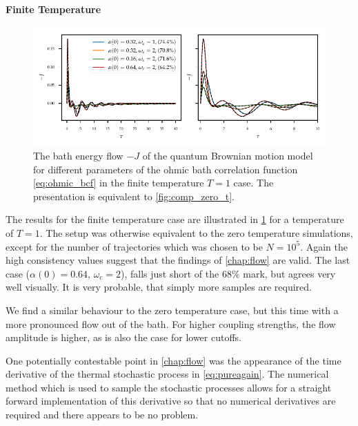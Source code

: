 
\paragraph{Finite Temperature}
\begin{figure}[t]
  \centering
  \includegraphics{figs/analytic_comp/flow_comp_nonzero.pdf}
  \caption{\label{fig:comp_finite_t} The bath energy flow \(-J\) of
    the quantum Brownian motion model for different parameters of the
    ohmic bath correlation function \cref{eq:ohmic_bcf} in the finite
    temperature \(T=1\) case. The presentation is equivalent to
    \cref{fig:comp_zero_t}.}
\end{figure}
The results for the finite temperature case are illustrated in
\cref{fig:comp_finite_t} for a temperature of \(T=1\). The setup was
otherwise equivalent to the zero temperature simulations, except for
the number of trajectories which was chosen to be \(N=10^5\).  Again
the high consistency values suggest that the findings of
\cref{chap:flow} are valid. The last case (\(α(0)=0.64,\, ω_c=2\)),
falls just short of the \(68\%\) mark, but agrees very well
visually. It is very probable, that simply more samples are required.

We find a similar behaviour to the zero temperature case, but this
time with a more pronounced flow out of the bath. For higher coupling
strengths, the flow amplitude is higher, as is also the case for lower
cutoffs.

One potentially contestable point in \cref{chap:flow} was the
appearance of the time derivative of the thermal stochastic process in
\cref{eq:pureagain}. The numerical method which is used to sample the
stochastic processes allows for a straight forward implementation of
this derivative so that no numerical derivatives are required and
there appears to be no problem.

